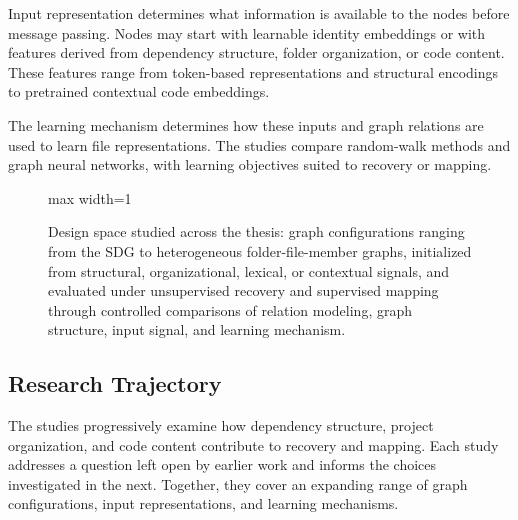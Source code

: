 Input representation determines what information is available to the nodes before message passing. Nodes may start with learnable identity embeddings or with features derived from dependency structure, folder organization, or code content. These features range from token-based representations and structural encodings to pretrained contextual code embeddings.
 
The learning mechanism determines how these inputs and graph relations are used to learn file representations. The studies compare random-walk methods and graph neural networks, with learning objectives suited to recovery or mapping.


\begin{figure}[!thb]
    \centering
    \begin{adjustbox}{max width=1\textwidth}
        
    \end{adjustbox}
\caption[Design space studied in the thesis.]{Design space studied across the thesis: graph configurations ranging from the SDG to heterogeneous folder-file-member graphs, initialized from structural, organizational, lexical, or contextual signals, and evaluated under unsupervised recovery and supervised mapping through controlled comparisons of relation modeling, graph structure, input signal, and learning mechanism. \label{fig:design_space}}
\end{figure}
 

\subsection{Research Trajectory \label{sec:research_trajectory}}

The studies progressively examine how dependency structure, project organization, and code content contribute to recovery and mapping. Each study addresses a question left open by earlier work and informs the choices investigated in the next. Together, they cover an expanding range of graph configurations, input representations, and learning mechanisms.
 
